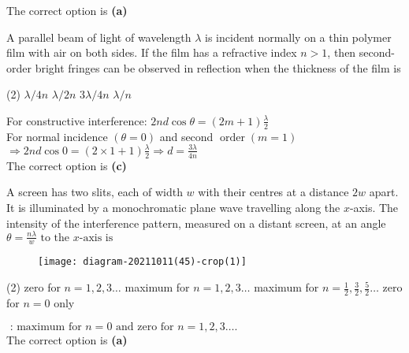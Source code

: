 \begin{enumerate}
\begin{answer}
	The correct option is \textbf{(a)}	
\end{answer}
\begin{minipage}{\textwidth}
	\item A parallel beam of light of wavelength $\lambda$ is incident normally on a thin polymer film with air on both sides. If the film has a refractive index $n>1$, then second-order bright fringes can be observed in reflection when the thickness of the film is
\end{minipage}
\begin{tasks}(2)
	\task[\textbf{A.}] $\lambda / 4 n$
	\task[\textbf{B.}]$\lambda / 2 n$
	\task[\textbf{C.}]$3 \lambda / 4 n$
	\task[\textbf{D.}] $\lambda / n$
\end{tasks}
\begin{answer}
	For constructive interference: $2 n d \cos \theta=(2 m+1) \frac{\lambda}{2}$\\
	For normal incidence $(\theta=0)$ and second $\operatorname{order}(m=1)$ $\Rightarrow 2 n d \cos 0=(2 \times 1+1) \frac{\lambda}{2} \Rightarrow d=\frac{3 \lambda}{4 n}$\\
	The correct option is \textbf{(c)}	
\end{answer}
\begin{minipage}{\textwidth}
	\item A screen has two slits, each of width $w$ with their centres at a distance $2 w$ apart. It is illuminated by a monochromatic plane wave travelling along the $x$-axis.
	The intensity of the interference pattern, measured on a distant screen, at an angle
	$\theta=\frac{n \lambda}{w} \text { to the } x \text {-axis is }$
	\begin{figure}[H]
		\centering
		\texttt{[image: diagram-20211011(45)-crop(1)]}
		\caption{}
		\label{}
	\end{figure}
\end{minipage}
\begin{tasks}(2)
	\task[\textbf{A.}] zero for $n=1,2,3 \ldots$ 
	\task[\textbf{B.}]maximum for $n=1,2,3 \ldots$
	\task[\textbf{C.}]maximum for $n=\frac{1}{2}, \frac{3}{2}, \frac{5}{2} \ldots$
	\task[\textbf{D.}]zero for $n=0$ only
\end{tasks}
\begin{answer}
	$\text { : maximum for } n=0 \text { and zero for } n=1,2,3 \ldots \text {. }$\\
	The correct option is \textbf{(a)}	
\end{answer}
\begin{minipage}{\textwidth}

\end{minipage}
\end{enumerate}
